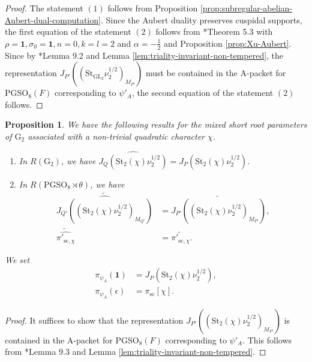 \documentclass[12pt]{amsart}
\theoremstyle{definition}
\theoremstyle{plain}
\newtheorem{proposition}[definition]{Proposition}
\theoremstyle{remark}
\def\GL{\mathrm{GL}}
\def\PGSO{\mathrm{PGSO}}
\numberwithin{equation}{section}
\newcommand{\rG}{\mathrm{G}}
\newcommand{\St}{\mathrm{St}}
\begin{document}
\begin{proof}
      The statement $(1)$ follows from Proposition \ref{prop:subregular-abelian-Aubert-dual-computation}.
      Since the Aubert duality preserves cuspidal supports, the first equation of the statement $(2)$ follows from \cite{BanJantzen2003-DegeneratePrincipalSeriesEvenOrthogonalGroups}*{Theorem 5.3} with $\rho = \mathbf{1}, \sigma_0 = \mathbf{1}, n = 0, k = l = 2$ and $\alpha = -\frac{1}{2}$ and Proposition \ref{prop:Xu-Aubert}.
      Since by \cite{Xu2024-ArthurPacketsQuasisplitGSp2nGO2n}*{Lemma 9.2} and Lemma \ref{lem:triality-invariant-non-tempered}, the representation $J_{P'}((\St_{\GL_2}\nu_2^{1/2})_{M_{P'}})$ must be contained in the A-packet for $\PGSO_8(F)$ corresponding to $\psi'_{A}$, the second equation of the statement $(2)$ follows.
\end{proof}


\begin{proposition}\label{prop:mixed-short-root-quadratic-ecr}
      We have the following results for the mixed short root parameters of ${\rG_2}$ associated with a non-trivial quadratic character $\chi$.
      \begin{enumerate}
            \item 
            In $R(\rG_2)$, we have 
            $\widehat{J_Q(\St_{2}(\chi)\nu_2^{1/2})} = J_P(\St_{2}(\chi)\nu_2^{1/2})$.
            \item 
            In $R(\PGSO_8 \rtimes \theta)$, we have 
            \begin{align*}
                  \widetilde{\widehat{J_{Q'}((\St_{2}(\chi) \nu_2^{1/2})_{M_{Q'}})}}
                  &= 
                  \widetilde{J_{P'}((\St_{2}(\chi) \nu_2^{1/2})_{M_{P'}})}, \\
                  \widetilde{\widehat{\pi'_{\mathrm{sc}, \chi}}} 
                  &=
                  \widetilde{\pi'_{\mathrm{sc}, \chi}}.
            \end{align*}
      \end{enumerate}

      We set
      \begin{align*}
            \pi_{\psi_A}(\mathbf{1}) &= J_P(\St_{2}(\chi)\nu_2^{1/2}), \\
            \pi_{\psi_A}(\epsilon) &= \pi_{\mathrm{sc}}[\chi].
      \end{align*}
\end{proposition}

\begin{proof}
      It suffices to show that the representation $J_{P'}((\St_{2}(\chi) \nu_2^{1/2})_{M_{P'}})$ is contained in the A-packet for $\PGSO_8(F)$ corresponding to $\psi'_{A}$.
      This follows from \cite{Xu2024-ArthurPacketsQuasisplitGSp2nGO2n}*{Lemma 9.3} and Lemma \ref{lem:triality-invariant-non-tempered}.
\end{proof}
\end{document}
